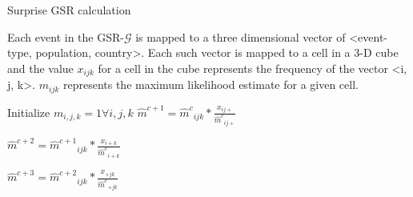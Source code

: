 \begin{algorithm}
\caption{Surprise GSR calculation}
\begin{algorithmic}[1]


\State Each event in the GSR-$\mathcal{G}$ is mapped to a three dimensional vector of <event-type, population, country>. Each such vector
       is mapped to a cell in a 3-D cube and the value $x_{ijk}$ for a cell in the cube represents the frequency of the vector <i, j, k>.
       $m_{ijk}$ represents the maximum likelihood estimate for a given cell.

\State Initialize $m_{i,j,k}=1 \forall i,j,k$
\State $\hat{m}^{c+1} = {\hat{m}^c}_{ijk}*\frac{x_{ij+}}{{\hat{m}^c}_{ij+}} $

\State $\hat{m}^{c+2} = {\hat{m}^{c+1}}_{ijk}*\frac{x_{i+k}}{{\hat{m}^c}_{i+k}} $

\State $\hat{m}^{c+3} = {\hat{m}^{c+2}}_{ijk}*\frac{x_{+jk}}{{\hat{m}^c}_{+jk}} $

\EndFor



\EndIf

\EndFor


\EndProcedure

\end{algorithmic}

\label{algo:maxent}
\end{algorithm}
